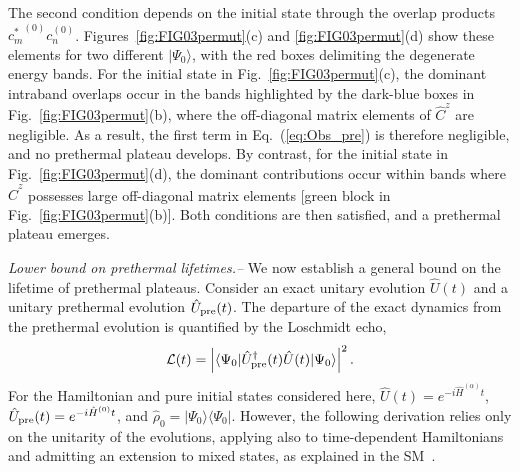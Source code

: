 \documentclass[aps,prl,amsfonts,floatfix,superscriptaddress,longbibliography,twocolumn,footinbib]{revtex4-2}
\begin{document}
The second condition depends on the initial state through the overlap products ${c_m^*}^{(0)}c_n^{(0)}$. Figures~\ref{fig:FIG03permut}(c) and \ref{fig:FIG03permut}(d) show these elements for two different $|\Psi_0\rangle$, with the red boxes delimiting the degenerate energy bands. For the initial state in Fig.~\ref{fig:FIG03permut}(c), the dominant intraband overlaps occur in the bands highlighted by the dark-blue boxes in Fig.~\ref{fig:FIG03permut}(b), where the off-diagonal matrix elements of $\hat C^z$ are negligible. As a result, the first term in Eq.~(\ref{eq:Obs_pre}) is therefore negligible, and no prethermal plateau develops. By contrast, for the initial state in
Fig.~\ref{fig:FIG03permut}(d), the dominant contributions occur within bands where $\hat C^z$ possesses large off-diagonal matrix elements [green
block in Fig.~\ref{fig:FIG03permut}(b)]. Both conditions are then satisfied, and a prethermal plateau emerges.



{\em Lower bound on prethermal lifetimes.--} We now establish a general bound on the lifetime of prethermal plateaus. Consider an exact unitary evolution $\hat U(t)$ and a unitary prethermal evolution $\hat U_{\rm pre}(t)$. The departure of the exact dynamics from the prethermal evolution is quantified by the Loschmidt echo,
\begin{align}
\mathcal L(t) = \left|
\langle\Psi_0|
\hat U_{\rm pre}^\dagger(t)\hat U(t)
|\Psi_0\rangle
\right|^2.
\label{eq:LE}
\end{align}
For the Hamiltonian and pure initial states considered here, $\hat U(t)=e^{-i\hat H^{(\alpha)}t}$, $\hat U_{\rm pre}(t)=e^{-i\hat H^{(0)}t}$, and $\hat\rho_0=|\Psi_0\rangle\langle\Psi_0|$. However, the following derivation relies only on the unitarity of the evolutions, applying also to time-dependent Hamiltonians and admitting an extension to mixed states, as explained in the SM~\cite{noteSUPPL}.
\end{document}

